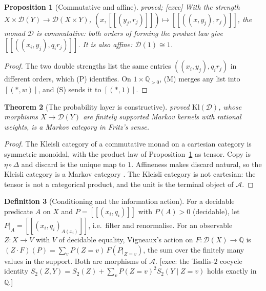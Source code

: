\documentclass[11pt]{article}
\newtheorem{theorem}{Theorem}[section]
\newtheorem{proposition}[theorem]{Proposition}
\theoremstyle{definition}
\newtheorem{definition}[theorem]{Definition}
\theoremstyle{remark}
\newcommand{\st}[1]{\textsf{\small\color{gray}#1}}
\begin{document}
\begin{proposition}[Commutative and affine]\label{prop:dcommaff}\st{proved; [exec]}
With the strength $X\times\mathcal D(Y)\to\mathcal D(X\times Y)$, $(x,[\![(y_j,r_j)]\!])\mapsto[\![((x,y_j),r_j)]\!]$, the monad $\mathcal D$ is \emph{commutative}: both orders of forming the product law give $[\![((x_i,y_j),q_ir_j)]\!]$. It is also \emph{affine}: $\mathcal D(1)\cong1$.
\end{proposition}
\begin{proof}
The two double strengths list the same entries $((x_i,y_j),q_ir_j)$ in different orders, which (P) identifies. On $1\times\mathbb Q_{>0}$, (M) merges any list into $[(\ast,w)]$, and (S) sends it to $[(\ast,1)]$.
\end{proof}

\begin{theorem}[The probability layer is constructive]\label{thm:klmarkov}\st{proved}
$\mathrm{Kl}(\mathcal D)$, whose morphisms $X\to\mathcal D(Y)$ are finitely supported Markov kernels with rational weights, is a Markov category in Fritz's sense.
\end{theorem}
\begin{proof}
The Kleisli category of a commutative monad on a cartesian category is symmetric monoidal, with the product law of Proposition~\ref{prop:dcommaff} as tensor. Copy is $\eta\circ\Delta$ and discard is the unique map to $1$. Affineness makes discard natural, so the Kleisli category is a Markov category \cite{fritz}. The Kleisli category is not cartesian: the tensor is not a categorical product, and the unit is the terminal object of $\mathcal A$.
\end{proof}

\begin{definition}[Conditioning and the information action]\label{def:dcond}
For a decidable predicate $A$ on $X$ and $P=[\![(x_i,q_i)]\!]$ with $P(A)>0$ (decidable), let $P|_A=[\![(x_i,q_i)_{A(x_i)}]\!]$, i.e.\ filter and renormalise. For an observable $Z:X\to V$ with $V$ of decidable equality, Vigneaux's action on $F:\mathcal D(X)\to\mathbb Q$ is $(Z\cdot F)(P)=\sum_{v}P(Z=v)\,F(P|_{Z=v})$, the sum over the finitely many values in the support. Both are morphisms of $\mathcal A$. [exec: the Tsallis-$2$ cocycle identity $S_2(Z,Y)=S_2(Z)+\sum_vP(Z=v)^2S_2(Y\mid Z=v)$ holds exactly in $\mathbb Q$.]
\end{definition}
\end{document}
